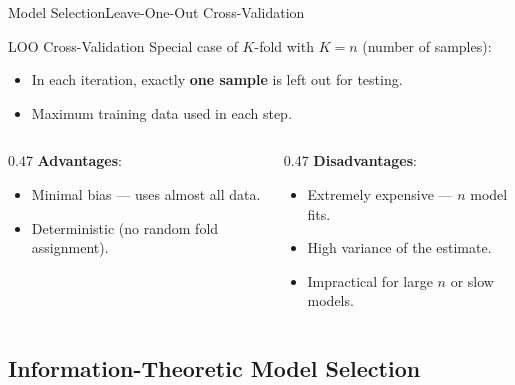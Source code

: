 \begin{frame}{Model Selection}{Leave-One-Out Cross-Validation}
  \begin{block}{LOO Cross-Validation}
    Special case of $K$-fold with $K = n$ (number of samples):
    \begin{itemize}
      \item In each iteration, exactly \textbf{one sample} is left out for testing.
      \item Maximum training data used in each step.
    \end{itemize}
  \end{block}

  \begin{columns}
    \begin{column}{0.47\textwidth}
      \textbf{Advantages}:
      \begin{itemize}
        \item Minimal bias — uses almost all data.
        \item Deterministic (no random fold assignment).
      \end{itemize}
    \end{column}
    \begin{column}{0.47\textwidth}
      \textbf{Disadvantages}:
      \begin{itemize}
        \item Extremely expensive — $n$ model fits.
        \item High variance of the estimate.
        \item Impractical for large $n$ or slow models.
      \end{itemize}
    \end{column}
  \end{columns}
\end{frame}

\subsection{Information-Theoretic Model Selection}

